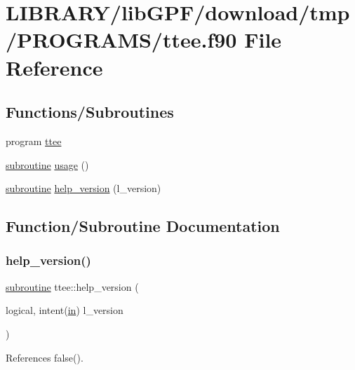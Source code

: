 \hypertarget{ttee_8f90}{}\section{L\+I\+B\+R\+A\+R\+Y/lib\+G\+P\+F/download/tmp/\+P\+R\+O\+G\+R\+A\+M\+S/ttee.f90 File Reference}
\label{ttee_8f90}
\subsection*{Functions/\+Subroutines}
\begin{DoxyCompactItemize}
\item 
program \hyperlink{ttee_8f90_aee7d8fff0d52c9b2adc07bda770aa84c}{ttee}
\item 
\hyperlink{M__stopwatch_83_8txt_acfbcff50169d691ff02d4a123ed70482}{subroutine} \hyperlink{ttee_8f90_a39e87a9f7d8f8fd9a22b457c12d7619a}{usage} ()
\item 
\hyperlink{M__stopwatch_83_8txt_acfbcff50169d691ff02d4a123ed70482}{subroutine} \hyperlink{ttee_8f90_a52d584f615aee4df11405de887c661b4}{help\+\_\+version} (l\+\_\+version)
\end{DoxyCompactItemize}


\subsection{Function/\+Subroutine Documentation}
\mbox{\label{ttee_8f90_a52d584f615aee4df11405de887c661b4}} 
\subsubsection{\texorpdfstring{help\+\_\+version()}{help\_version()}}
{\footnotesize\ttfamily \hyperlink{M__stopwatch_83_8txt_acfbcff50169d691ff02d4a123ed70482}{subroutine} ttee\+::help\+\_\+version (\begin{DoxyParamCaption}\item[{logical, intent(\hyperlink{M__journal_83_8txt_afce72651d1eed785a2132bee863b2f38}{in})}]{l\+\_\+version }\end{DoxyParamCaption})}



References false().

